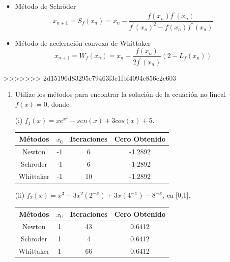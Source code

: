 \documentclass{udparticle}
\begin{document}
\begin{enumerate}
\begin{itemize}
        \item Método de Schröder
            \begin{equation*}
                x_{n+1}=S_f(x_n)=x_n-\frac{f(x_n)f^{'}(x_n)}{f^{'}(x_n)^{2}-f(x_n)f^{''}(x_n)}
            \end{equation*}
        
        \item Método de aceleración convexa de Whittaker
            \begin{equation*}
                x_{n+1}=W_f(x_n)=x_n - \frac{f(x_n)}{2f^{'}(x_n)}(2 - L_f(x_n))
            \end{equation*}
        
\end{itemize}
>>>>>>> 2d15196d83295c79463f3c1fbf4094e856e2e603
	\begin{enumerate}
	
		\item Utilize los métodos para encontrar la solución de la ecuación no lineal $f(x)=0$, donde
		
		(i) $f_{1}(x)=xe^{x^2}-sen(x)+3cos(x)+5$.
		
		\begin{table}[H]
			\centering
			\begin{tabular}{|c|c|c|c|}
				\hline
				Métodos & $x_{0}$ & Iteraciones & Cero Obtenido \\
				\hline
				Newton & -1 & 6 & -1.2892 \\
				\hline
				Schroder & -1 & 6 & -1.2892 \\
				\hline
				Whittaker & -1 & 10 & -1.2892 \\
				\hline				
			\end{tabular}
			\end{table}	
		
		
		
		(ii) $f_{2}(x)=x^3-3x^2(2^{-x})+3x(4^{-x})-8^{-x}$, en [0,1].
		
			\begin{table}[H]
			\centering
			\begin{tabular}{|c|c|c|c|}
				\hline
				Métodos & $x_{0}$ & Iteraciones & Cero Obtenido \\
				\hline
				Newton & 1 & 43 & 0.6412 \\
				\hline
				Schroder & 1 & 4 & 0.6412\\
				\hline
				Whittaker & 1 & 66 & 0.6412\\
				\hline				
			\end{tabular}
			\end{table}	
			

\end{enumerate}
\end{enumerate}
\end{document}
